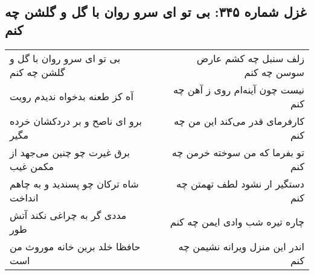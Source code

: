 \begin{center}
\section*{غزل شماره ۳۴۵: بی تو ای سرو روان با گل و گلشن چه کنم}
\label{sec:sh345}
\begin{longtable}{l p{0.5cm} r}
بی تو ای سرو روان با گل و گلشن چه کنم
&&
زلف سنبل چه کشم عارض سوسن چه کنم
\\
آه کز طعنه بدخواه ندیدم رویت
&&
نیست چون آینه‌ام روی ز آهن چه کنم
\\
برو ای ناصح و بر دردکشان خرده مگیر
&&
کارفرمای قدر می‌کند این من چه کنم
\\
برق غیرت چو چنین می‌جهد از مکمن غیب
&&
تو بفرما که من سوخته خرمن چه کنم
\\
شاه ترکان چو پسندید و به چاهم انداخت
&&
دستگیر ار نشود لطف تهمتن چه کنم
\\
مددی گر به چراغی نکند آتش طور
&&
چاره تیره شب وادی ایمن چه کنم
\\
حافظا خلد برین خانه موروث من است
&&
اندر این منزل ویرانه نشیمن چه کنم
\\
\end{longtable}
\end{center}
